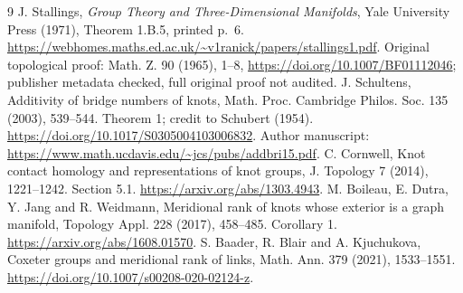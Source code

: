 \documentclass[11pt]{article}
\begin{document}
\clearpage
\begin{thebibliography}{9}
 J. Stallings, \emph{Group Theory and
Three-Dimensional Manifolds}, Yale University Press (1971),
Theorem 1.B.5, printed p.~6.
\url{https://webhomes.maths.ed.ac.uk/~v1ranick/papers/stallings1.pdf}.
Original topological proof: Math. Z. 90 (1965), 1--8,
\url{https://doi.org/10.1007/BF01112046}; publisher metadata
checked, full original proof not audited.
 J. Schultens, Additivity of bridge numbers
of knots, Math. Proc. Cambridge Philos. Soc. 135 (2003),
539--544. Theorem 1; credit to Schubert (1954).
\url{https://doi.org/10.1017/S0305004103006832}.
Author manuscript:
\url{https://www.math.ucdavis.edu/~jcs/pubs/addbri15.pdf}.
 C. Cornwell, Knot contact homology and
representations of knot groups, J. Topology 7 (2014),
1221--1242. Section 5.1.
\url{https://arxiv.org/abs/1303.4943}.
 M. Boileau, E. Dutra, Y. Jang and R. Weidmann,
Meridional rank of knots whose exterior is a graph manifold,
Topology Appl. 228 (2017), 458--485. Corollary 1.
\url{https://arxiv.org/abs/1608.01570}.
 S. Baader, R. Blair and A. Kjuchukova,
Coxeter groups and meridional rank of links,
Math. Ann. 379 (2021), 1533--1551.
\url{https://doi.org/10.1007/s00208-020-02124-z}.
\end{thebibliography}
\end{document}
